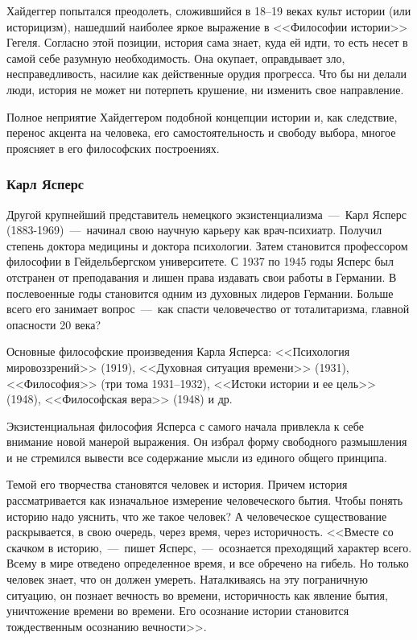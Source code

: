 \documentclass{bmstu}
\begin{document}
Хайдеггер попытался преодолеть, сложившийся в 18--19 веках культ истории (или историцизм), нашедший наиболее яркое выражение в <<Философии истории>> Гегеля. Согласно этой позиции, история сама знает, куда ей идти, то есть несет в самой себе разумную необходимость. Она окупает, оправдывает зло, несправедливость, насилие как действенные орудия прогресса. Что бы ни делали люди, история не может ни потерпеть крушение, ни изменить свое направление.

Полное неприятие Хайдеггером подобной концепции истории и, как следствие, перенос акцента на человека, его самостоятельность и свободу выбора, многое проясняет в его философских построениях.


\subsubsection*{Карл Ясперс}

Другой крупнейший представитель немецкого экзистенциализма~---~Карл Ясперс (1883-1969)~---~начинал свою научную карьеру как врач-психиатр. Получил степень доктора медицины и доктора психологии. Затем становится профессором философии в Гейдельбергском университете. С 1937 по 1945 годы Ясперс был отстранен от преподавания и лишен права издавать свои работы в Германии. В послевоенные годы становится одним из духовных лидеров Германии. Больше всего его занимает вопрос~---~как спасти человечество от тоталитаризма, главной опасности 20 века?

Основные философские произведения Карла Ясперса: <<Психология мировоззрений>> (1919), <<Духовная ситуация времени>> (1931), <<Философия>> (три тома 1931--1932), <<Истоки истории и ее цель>> (1948), <<Философская вера>> (1948) и др.

Экзистенциальная философия Ясперса с самого начала привлекла к себе внимание новой манерой выражения. Он избрал форму свободного размышления и не стремился вывести все содержание мысли из единого общего принципа.

Темой его творчества становятся человек и история. Причем история рассматривается как изначальное измерение человеческого бытия. Чтобы понять историю надо уяснить, что же такое человек? А человеческое существование раскрывается, в свою очередь, через время, через историчность. <<Вместе со скачком в историю,~---~пишет Ясперс,~---~осознается преходящий характер всего. Всему в мире отведено определенное время, и все обречено на гибель. Но только человек знает, что он должен умереть. Наталкиваясь на эту пограничную ситуацию, он познает вечность во времени, историчность как явление бытия, уничтожение времени во времени. Его осознание истории становится тождественным осознанию вечности>>.
\end{document}
